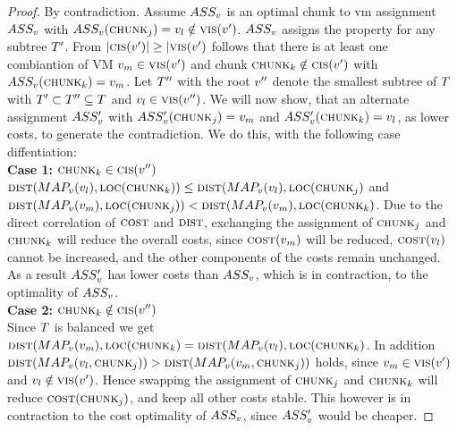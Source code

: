 \begin{proof}
 By contradiction. Assume $ASS_v$ is an optimal chunk to vm 
assignment $ASS_v$ with $ASS_v(\textsc{chunk}_j) 
=v_l \notin \textsc{vis}(v')$. $ASS_v$ assigns 
the property for any subtree $T'$. From $|\textsc{cis}(v')| 
\geq 
|\textsc{vis}(v')$ follows that there is at least one combiantion of 
VM 
$v_m \in \textsc{vis}(v')$ and chunk $\textsc{chunk}_k \notin 
\textsc{cis}(v')$ with $ASS_v(\textsc{chunk}_k) = 
v_m$. Let $T''$ with the root $v''$ denote the 
smallest subtree of $T$ with $T' \subset T'' \subseteq T$ and 
$v_l \in \textsc{vis}(v'')$. We will now show, that an 
alternate assignment $ASS_v'$ with 
$ASS_v'(\textsc{chunk}_j) = v_m$ and 
$ASS_v'(\textsc{chunk}_k) = v_l$, as lower costs, to generate 
the contradiction. We do this, with the following case diffentiation: 
\\
\textbf{Case 1:} $\textsc{chunk}_k \in \textsc{cis}(v'')$\\
$\textsc{dist}(MAP_v(v_l), \textsc{loc}(\textsc{chunk}_k)) \leq 
\textsc{dist}(MAP_v(v_l), \textsc{loc}(\textsc{chunk}_j)$ and 
$\textsc{dist}(MAP_v(v_m), \textsc{loc}(\textsc{chunk}_j)) < 
\textsc{dist}(MAP_v(v_m), \textsc{loc}(\textsc{chunk}_k)$. Due to the 
direct correlation of $\textsc{cost}$ and $\textsc{dist}$, exchanging the 
assignment of $\textsc{chunk}_j$ and $\textsc{chunk}_k$ will reduce the overall costs, since 
$\textsc{cost}(v_m)$ will be reduced, 
$\textsc{cost}(v_l)$ cannot be increased, and the other components 
of the costs remain unchanged. As a result $ASS_v'$ has lower 
costs than $ASS_v$, which is in contraction, to the optimality of
$ASS_v$.\\
\textbf{Case 2:} $\textsc{chunk}_k \notin \textsc{cis}(v'')$\\
Since $T$ is balanced we get $\textsc{dist}(MAP_v(v_m), 
\textsc{loc}(\textsc{chunk}_k)  = \textsc{dist}(MAP_v(v_l), 
\textsc{loc}(\textsc{chunk}_k)$. In addition $\textsc{dist}(MAP_v(v_l, 
\textsc{chunk}_j)) > \textsc{dist}(MAP_v(v_m, 
\textsc{chunk}_j)) $ holds, since $v_m \in \textsc{vis}(v')$ and 
$v_l \notin 
\textsc{vis}(v')$. Hence swapping the assignment of $\textsc{chunk}_j$ and 
$\textsc{chunk}_k$ will reduce $\textsc{cost}(\textsc{chunk}_j)$, and keep all other costs 
stable. This however is in contraction to the cost optimality of 
$ASS_v$, since $ASS_v'$ would be cheaper.
\end{proof}

